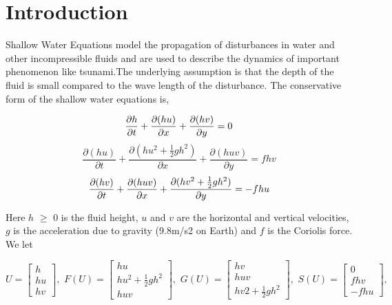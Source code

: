 
\section{Introduction}
\par

Shallow Water Equations model the propagation of disturbances in water and other incompressible fluids and are used to describe the 
dynamics of important phenomenon like tsunami.The underlying assumption is that the depth of the fluid is small compared to 
the wave length of the disturbance. The conservative form of the shallow water equations is,

\begin{equation}\label{eqn:1}
{\frac{\partial h}{\partial t} + \frac{\partial (hu)}{\partial x} + \frac{\partial (hv)}{\partial y} = 0 } \notag
\end{equation}
\begin{equation}
{\frac{\partial (hu)}{\partial t} + \frac{\partial (hu^2 + \frac{1}{2} gh ^2)}{\partial x} + \frac{\partial (huv)}{\partial y} = fhv }
\end{equation}
\begin{equation}
{\frac{\partial (hv)}{\partial t} + \frac{\partial (huv)}{\partial x}+\frac{\partial (hv^2 + \frac{1}{2} gh ^2)}{\partial y}=-fhu } \notag
\end{equation}

Here $h$ $\ge$ 0 is the fluid height, $u$ and $v$ are the horizontal and vertical velocities, $g$ is the acceleration due to gravity (9.8m/s2 on Earth) 
and $f$ is the Coriolis force. We let


\[U = \begin{bmatrix} h \\ hu \\ hv\end{bmatrix},\,\, F(U) = \begin{bmatrix} hu \\ hu^2 +  \frac{1}{2} gh^2 \\ huv \end{bmatrix},\,\,
G(U) = \begin{bmatrix} hv \\ huv \\ hv2 +  \frac{1}{2} gh^2 \end{bmatrix},\,\, 
S(U) = \begin{bmatrix} 0 \\ fhv \\ -fhu \end{bmatrix}, \]



